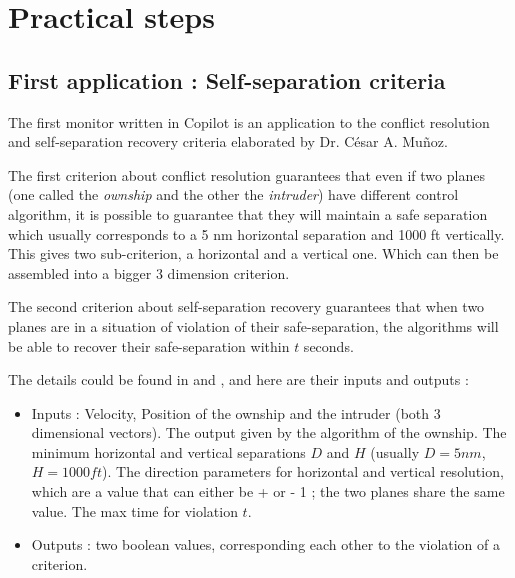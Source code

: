 \documentclass[a4paper,11pt,final]{article}
\begin{document}
	\section{Practical steps}
	\subsection{First application : Self-separation criteria}
	
	The first monitor written in Copilot is an application to the conflict resolution and self-separation recovery criteria elaborated by Dr. César A. Muñoz. 
	
	The first criterion about conflict resolution guarantees that even if two planes (one called the \emph{ownship} and the other the \emph{intruder}) have different control algorithm, it is possible to guarantee that they will maintain a safe separation which usually corresponds to a 5 nm horizontal separation and 1000 ft vertically. This gives two sub-criterion, a horizontal and a vertical one. Which can then be assembled into a bigger 3 dimension criterion.
	
	The second criterion about self-separation recovery guarantees that when two planes are in a situation of violation of their safe-separation, the algorithms will be able to recover their safe-separation within $t$ seconds.
	
	The details could be found in \cite{MBNMH2010NASA} and \cite{NM2011NASA}, and here are their inputs and outputs :
	\begin{itemize}
		\item Inputs : Velocity, Position of the ownship and the intruder (both 3 dimensional vectors). The output given by the algorithm of the ownship. The minimum horizontal and vertical separations $D$ and $H$ (usually $D = 5nm$, $H=1000ft$). The direction parameters for horizontal and vertical resolution, which are a value that can either be + or - 1 ; the two planes share the same value. The max time for violation $t$.
		\item Outputs : two boolean values, corresponding each other to the violation of a criterion.
	\end{itemize}
	
\end{document}
